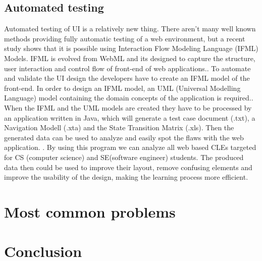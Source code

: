 \documentclass[10pt,english,a4paper]{article} %
\begin{document}
\subsection{Automated testing}
Automated testing of UI is a relatively new thing.\cite{automated_testing_ifml} There aren't many well known methods
providing fully automatic testing of a web environment, but a recent study shows that
it is possible using Interaction Flow Modeling Language (IFML) Models.\cite{automated_testing_ifml}
IFML is evolved from WebML and its designed to capture the structure, user interaction and control
flow of front-end of web applications.\cite{automated_testing_ifml}.
To automate and validate the UI design the developers have to create an IFML model
of the front-end. In order to design an IFML model, an UML (Universal Modelling Language) model 
containing the domain concepts of the application is required.\cite{automated_testing_ifml}. 
When the IFML and the UML models are created they have to be processed by an application written 
in Java, which will generate a test case document (.txt), a Navigation Modell (.xta) and the State Transition 
Matrix (.xls). Then the generated data can be used to analyze and easily spot the flaws with the web application.
\cite{automated_testing_ifml}. 
By using this program we can analyze all web based CLEs targeted for CS (computer science) and SE(software engineer) 
students. The produced data then could be used to improve their layout, remove confusing elements and improve the usability of the design,
making the learning process more efficient.


\section{Most common problems}\label{problems}


\section{Conclusion}






\end{document}
